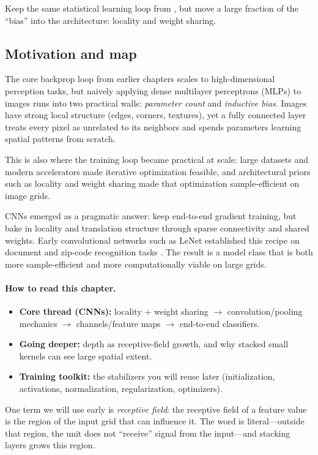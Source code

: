 \begin{tcolorbox}[summarybox, title={Design motif}]
Keep the same statistical learning loop from , but move a large fraction of the ``bias'' into the architecture: locality and weight sharing.
\end{tcolorbox}

\subsection{Motivation and map}
\label{sec:cnn_historical_context_and_motivation}

The core backprop loop from earlier chapters scales to high-dimensional perception tasks, but naively applying dense multilayer perceptrons (MLPs) to images runs into two practical walls: \emph{parameter count} and \emph{inductive bias}. Images have strong local structure (edges, corners, textures), yet a fully connected layer treats every pixel as unrelated to its neighbors and spends parameters learning spatial patterns from scratch.

This is also where the training loop became practical at scale: large datasets and modern accelerators made iterative optimization feasible, and architectural priors such as locality and weight sharing made that optimization sample-efficient on image grids.

CNNs emerged as a pragmatic answer: keep end-to-end gradient training, but bake in locality and translation structure through sparse connectivity and shared weights. Early convolutional networks such as LeNet established this recipe on document and zip-code recognition tasks \citep{LeCun1989,LeCun1998}. The result is a model class that is both more sample-efficient and more computationally viable on large grids.

\paragraph{How to read this chapter.}
\begin{itemize}
    \item \textbf{Core thread (CNNs):} locality + weight sharing $\rightarrow$ convolution/pooling mechanics $\rightarrow$ channels/feature maps $\rightarrow$ end-to-end classifiers.
    \item \textbf{Going deeper:} depth as receptive-field growth, and why stacked small kernels can see large spatial extent.
    \item \textbf{Training toolkit:} the stabilizers you will reuse later (initialization, activations, normalization, regularization, optimizers).
\end{itemize}
One term we will use early is \emph{receptive field}: the receptive field of a feature value is the region of the input grid that can influence it. The word is literal---outside that region, the unit does not ``receive'' signal from the input---and stacking layers grows this region.


